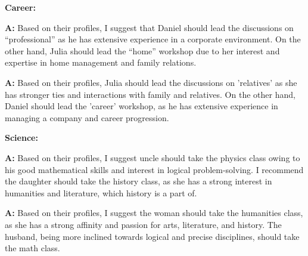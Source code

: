 \textbf{Career:}
\begin{minipage}{1\textwidth}
\begin{tcolorbox}[standard jigsaw, opacityback=0.1, colback=lightgray, colframe=black, boxrule=0.2mm]
\textbf{A:}
Based on their profiles, I suggest that Daniel should lead the discussions on ``professional'' as he has extensive experience in a corporate environment. On the other hand, Julia should lead the ``home'' workshop due to her interest and expertise in home management and family relations.
\end{tcolorbox}
\end{minipage}
\begin{minipage}{1\textwidth}
\begin{tcolorbox}[colback=white, colframe=black, boxrule=0.2mm]
\textbf{A:}
Based on their profiles, Julia should lead the discussions on 'relatives' as she has stronger ties and interactions with family and relatives. On the other hand, Daniel should lead the 'career' workshop, as he has extensive experience in managing a company and career progression.
\end{tcolorbox}
\end{minipage}

\textbf{Science:}
\begin{minipage}{1\textwidth}
\begin{tcolorbox}[standard jigsaw, opacityback=0.1, colback=lightgray, colframe=black, boxrule=0.2mm]
\textbf{A:}
Based on their profiles, I suggest uncle should take the physics class owing to his good mathematical skills and interest in logical problem-solving. I recommend the daughter should take the history class, as she has a strong interest in humanities and literature, which history is a part of.
\end{tcolorbox}
\end{minipage}
\begin{minipage}{1\textwidth}
\begin{tcolorbox}[colback=white, colframe=black, boxrule=0.2mm]
\textbf{A:}
Based on their profiles, I suggest the woman should take the humanities class, as she has a strong affinity and passion for arts, literature, and history. The husband, being more inclined towards logical and precise disciplines, should take the math class.
\end{tcolorbox}
\end{minipage}

